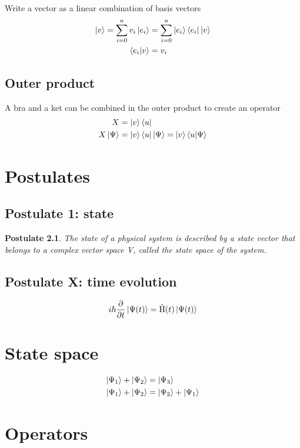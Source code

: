 \documentclass[10pt,a4paper]{book}
\newtheorem{post}{Postulate}
\DeclareMathOperator {\opH} {\hat{H}}
\begin{document}
Write a vector as a linear combination of basis vectors
\begin{align}
	\ket{v} = \sum_{i=0}^n v_i\ket{e_i} &= \sum_{i=0}^n \ket{e_i}\bra{e_i}\ket{v} \\
	\braket{e_i|v} &= v_i
\end{align}

\section{Outer product}
A bra and a ket can be combined in the outer product to create an operator
\textbf{\begin{align}
	X &= \ket{v}\bra{u} \\
	X\ket{\Psi} &= \ket{v}\bra{u}\ket{\Psi} = \ket{v}\braket{u|\Psi}  \\
\end{align}
}

\chapter{Postulates}
\section{Postulate 1: state}

\begin{post}
	The state of a physical system is described by a state vector that belongs to a complex vector space V, called the state space of the system.
\end{post}


\section{Postulate X: time evolution}
\begin{align}
	i\hbar \frac{ \partial } { \partial t } \ket{ \Psi(t) } = \opH(t)\ket{ \Psi(t) }
\end{align}


\chapter{State space}
\begin{align}
	\ket{ \Psi_1} + \ket{ \Psi_2} & = \ket{ \Psi_3}                 \\
	\ket{ \Psi_1} + \ket{ \Psi_2} & = \ket{ \Psi_2} + \ket{ \Psi_1}
\end{align}
\chapter{Operators}
\end{document}
